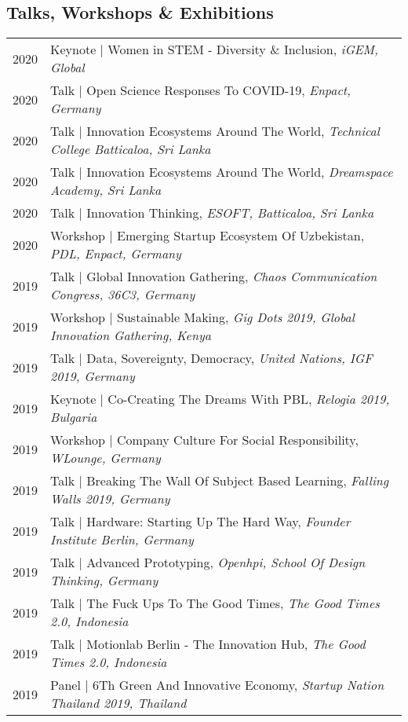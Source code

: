 \subsection{Talks, Workshops \& Exhibitions}
\begin{longtable}
	{r|p{13cm}}
	\textsc{2020} & Keynote | Women in STEM - Diversity \& Inclusion, \emph{iGEM, Global}\\
	\textsc{2020} & Talk | Open Science Responses To COVID-19, \emph{Enpact, Germany}\\
	\textsc{2020} & Talk | Innovation Ecosystems Around The World, \emph{Technical College Batticaloa, Sri Lanka}\\
	\textsc{2020} & Talk | Innovation Ecosystems Around The World, \emph{Dreamspace Academy, Sri Lanka}\\
	\textsc{2020} & Talk | Innovation Thinking, \emph{ESOFT, Batticaloa, Sri Lanka}\\
	\textsc{2020} & Workshop | Emerging Startup Ecosystem Of Uzbekistan, \emph{PDL, Enpact, Germany}\\
	\textsc{2019} & Talk | Global Innovation Gathering, \emph{Chaos Communication Congress, 36C3, Germany}\\
	\textsc{2019} & Workshop | Sustainable Making, \emph{Gig Dots 2019, Global Innovation Gathering, Kenya}\\
	\textsc{2019} & Talk | Data, Sovereignty, Democracy, \emph{United Nations, IGF 2019, Germany}\\
	\textsc{2019} & Keynote | Co-Creating The Dreams With PBL, \emph{Relogia 2019, Bulgaria}\\
	\textsc{2019} & Workshop | Company Culture For Social Responsibility, \emph{WLounge, Germany}\\
	\textsc{2019} & Talk | Breaking The Wall Of Subject Based Learning, \emph{Falling Walls 2019, Germany}\\
	\textsc{2019} & Talk | Hardware: Starting Up The Hard Way, \emph{Founder Institute Berlin, Germany}\\
	\textsc{2019} & Talk | Advanced Prototyping, \emph{Openhpi, School Of Design Thinking, Germany}\\
	\textsc{2019} & Talk | The Fuck Ups To The Good Times, \emph{The Good Times 2.0, Indonesia}\\
	\textsc{2019} & Talk | Motionlab Berlin - The Innovation Hub, \emph{The Good Times 2.0, Indonesia}\\
	\textsc{2019} & Panel | 6Th Green And Innovative Economy, \emph{Startup Nation Thailand 2019, Thailand}\\

\end{longtable}
